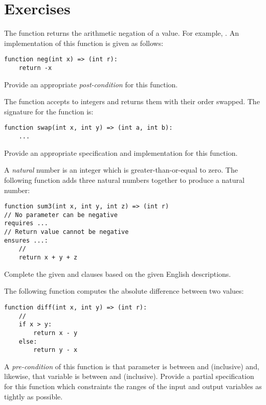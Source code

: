 \section{Exercises}

\begin{ex}
The function  returns the arithmetic negation of a value.
For example, .  An implementation of
this function is given as follows:
\begin{lstlisting}
function neg(int x) => (int r):
    return -x
\end{lstlisting}
Provide an appropriate {\em post-condition} for this function.
\end{ex}

\begin{ex}
The  function accepts to integers and returns them
with their order swapped.  The signature for the function is:
\begin{lstlisting}
function swap(int x, int y) => (int a, int b):
    ...
\end{lstlisting}
Provide an appropriate specification and implementation for this function.
\end{ex}

\begin{ex}

A {\em natural} number is an integer which is greater-than-or-equal to
zero.  The following function adds three natural numbers together to produce a natural number:
\begin{lstlisting}
function sum3(int x, int y, int z) => (int r)
// No parameter can be negative
requires ...
// Return value cannot be negative
ensures ...:
    //
    return x + y + z
\end{lstlisting}
Complete the given  and 
clauses based on the given English descriptions.

\end{ex}

\begin{ex}
  The following function computes the absolute difference between two values:

\begin{lstlisting}
function diff(int x, int y) => (int r):
    //
    if x > y:
        return x - y
    else:
        return y - x
\end{lstlisting}

A {\em pre-condition} of this function is that parameter 
is between  and  (inclusive) and,
likewise, that variable  is between  and
 (inclusive).  Provide a partial specification for
this function which constraints the ranges of the input and output
variables as tightly as possible.
\end{ex}

